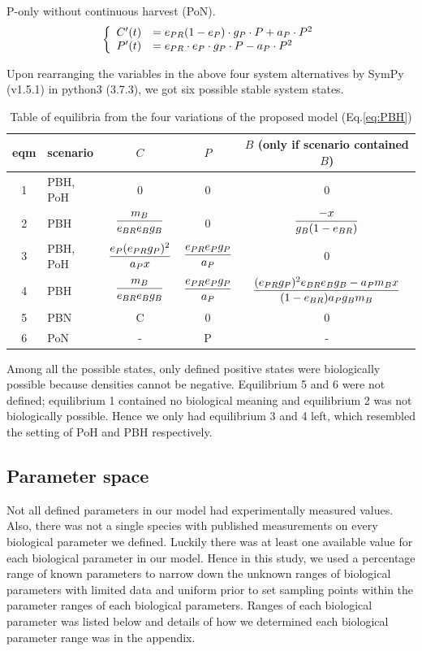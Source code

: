 \documentclass[../thesis.tex]{subfiles} %
\begin{document}
P-only without continuous harvest (PoN).
\begin{equation}\left\{\begin{array}{rl}
    C'(t) &= e_{PR}(1-e_P)\cdot g_P\cdot P +a_P\cdot P^2\\
    P'(t) &= e_{PR}\cdot e_P\cdot g_P\cdot P -a_P\cdot P^2
\end{array}\right.\label{eq:PoN}\end{equation}

Upon rearranging the variables in the above four system alternatives by SymPy (v1.5.1) in python3 (3.7.3), we got six possible stable system states.

\begin{table}[H]
    \centering
    \caption{Table of equilibria from the four variations of the proposed model (Eq.\ref{eq:PBH})}
    \begin{tabular}{cl|ccc}\hline
        eqm & scenario & $C$ & $P$ & $B$ (only if scenario contained $B$) \\\hline
        1 & PBH, PoH & 0 & 0 & 0 \\
        2 & PBH & $\dfrac{m_B}{e_{BR}e_Bg_B}$ & 0 & $\dfrac{-x}{g_B(1-e_{BR})}$ \\
        3 & PBH, PoH & $\dfrac{e_P(e_{PR}g_P)^2}{a_P x}$ & $\dfrac{e_{PR}e_Pg_P}{a_P}$ & 0 \\
        4 & PBH & $\dfrac{m_B}{e_{BR}e_Bg_B}$ & $\dfrac{e_{PR}e_Pg_P}{a_P}$ & $\dfrac{(e_{PR}g_P)^2e_{BR}e_Bg_B-a_Pm_B x}{(1-e_{BR})a_Pg_Bm_B}$ \\
        5 & PBN & C & 0 & 0 \\
        6 & PoN & - & P & - \\\hline
    \end{tabular}
    \label{t:eqm}
\end{table}

Among all the possible states, only defined positive states were biologically possible because densities cannot be negative.  Equilibrium 5 and 6 were not defined; equilibrium 1 contained no biological meaning and equilibrium 2 was not biologically possible.  Hence we only had equilibrium 3 and 4 left, which resembled the setting of PoH and PBH respectively.

\subsection{Parameter space}
Not all defined parameters in our model had experimentally measured values.  Also, there was not a single species with published measurements on every biological parameter we defined.  Luckily there was at least one available value for each biological parameter in our model.  Hence in this study, we used a percentage range of known parameters to narrow down the unknown ranges of biological parameters with limited data and uniform prior to set sampling points within the parameter ranges of each biological parameters.  Ranges of each biological parameter was listed below and details of how we determined each biological parameter range was in the appendix.
\end{document}
